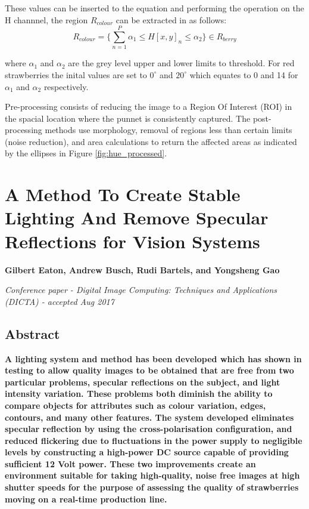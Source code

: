 \documentclass[fleqn,twoside]{article}
\begin{document}
These values can be inserted to the equation and performing the operation on the H channnel, the region $R_{colour}$ can be extracted in as follows:
\begin{equation}
R_{colour} = \bigg\{\sum_{n=1}^{P} \alpha_1 \leq H[x,y]_n \leq \alpha_2\bigg\} \in R_{berry}
\end{equation}


where $\alpha_1$ and $\alpha_2$ are the grey level upper and lower limits to threshold. For red strawberries the inital values are set to $0^{\circ}$ and $20^{\circ}$ which equates to 0 and 14 for $\alpha_1$ and $\alpha_2$ respectively.

Pre-processing consists of reducing the image to a Region Of Interest (ROI) in the spacial location where the punnet is consistently captured. The post-processing methods use morphology, removal of regions less than certain limits (noise reduction), and area calculations to return the affected areas as indicated by the ellipses in Figure \ref{fig:hue_processed}.



\newpage
\section{A Method To Create Stable Lighting And Remove Specular Reflections for Vision Systems}
\label{sec:paper_1}

\textbf{Gilbert Eaton, Andrew Busch, Rudi Bartels, and Yongsheng Gao}

\textit{Conference paper - Digital Image Computing: Techniques and Applications (DICTA) - accepted Aug 2017}


\subsection{Abstract}

\textbf{A lighting system and method has been developed which has shown in testing to allow quality images to be obtained that are free from two particular problems, specular reflections on the subject, and light intensity variation. These problems both diminish the ability to compare objects for attributes such as colour variation, edges, contours, and many other features. The system developed eliminates specular reflection by using the cross-polarisation configuration, and reduced flickering due to fluctuations in the power supply to negligible levels by constructing a high-power DC source capable of providing sufficient 12 Volt power. These two improvements create an environment suitable for taking high-quality, noise free images at high shutter speeds for the purpose of assessing the quality of strawberries moving on a real-time production line.}
\end{document}
